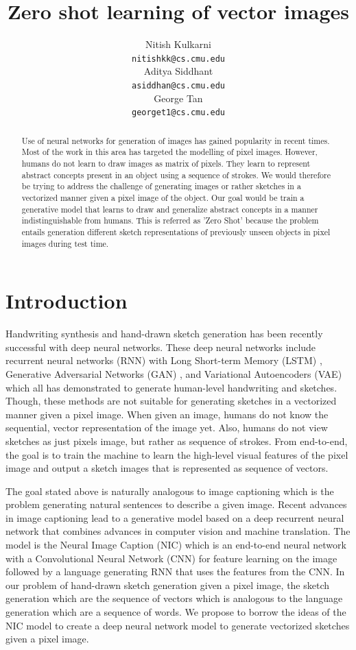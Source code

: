 \documentclass{article}
\title{Zero shot learning of vector images}
\author{
  Nitish Kulkarni \\
  \texttt{nitishkk@cs.cmu.edu} \\
  \And
  Aditya Siddhant \\
  \texttt{asiddhan@cs.cmu.edu} \\
  \And
  George Tan \\
  \texttt{georget1@cs.cmu.edu} \\
}
\begin{document}

\maketitle

\begin{abstract}
Use of neural networks for generation of images has gained popularity in recent times.  Most of the work in this area has targeted the modelling of pixel images. However, humans do not learn to draw images as matrix of pixels. They learn to represent abstract concepts present in an object using a sequence of strokes. We would therefore be trying to address the challenge of generating images or rather sketches in a vectorized manner given a pixel image of the object. Our goal would be train a generative model that learns to draw and generalize abstract concepts in a manner indistinguishable from humans. This is referred as 'Zero Shot' because the problem entails generation different sketch representations of previously unseen objects in pixel images during test time.
\end{abstract}


\section{Introduction}
Handwriting synthesis and hand-drawn sketch generation has been recently successful with deep neural networks. These deep neural networks include recurrent neural networks (RNN) with Long Short-term Memory (LSTM) \cite{LSTM}, Generative Adversarial Networks (GAN) \cite{GAN}, and Variational Autoencoders (VAE) \cite{journals/corr/KingmaW13} which all has demonstrated to generate human-level handwriting and sketches. Though, these methods are not suitable for generating sketches in a vectorized manner given a pixel image. When given an image, humans do not know the sequential, vector
representation of the image yet. Also, humans do not view sketches as just pixels image, but rather as sequence of strokes. From end-to-end, the goal is to train the machine to learn the high-level visual features of the pixel image and output a sketch images that is represented as sequence of vectors.

The goal stated above is naturally analogous to image captioning which is the problem generating natural sentences to describe a given image. Recent advances in image captioning lead to a generative model based on a deep recurrent neural network that combines advances in computer vision and machine translation. The model is the Neural Image Caption (NIC) \cite{DBLP:journals/corr/VinyalsTBE14} which is an end-to-end neural network with a Convolutional Neural Network (CNN) for feature learning on the image followed by a language generating RNN that uses the features from the CNN. In our problem of hand-drawn sketch generation given a pixel image, the sketch generation which are the sequence of vectors which is analogous to the language generation which are a sequence of words. We propose to borrow the ideas of the NIC model to create a deep neural network model to generate vectorized sketches given a pixel image.
\end{document}
